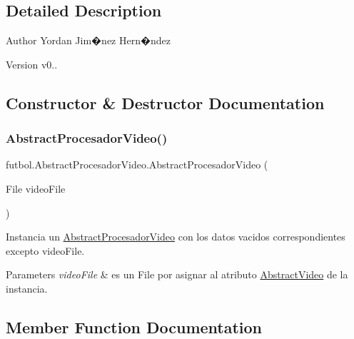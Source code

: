 \subsection{Detailed Description}
\begin{DoxyAuthor}{Author}
Yordan Jim�nez Hern�ndez 
\end{DoxyAuthor}
\begin{DoxyVersion}{Version}
v0.. 
\end{DoxyVersion}


\subsection{Constructor \& Destructor Documentation}
\hypertarget{classfutbol_1_1_abstract_procesador_video_a31d3acce4fce02bd1f2b93d4c2b48955}{}\label{classfutbol_1_1_abstract_procesador_video_a31d3acce4fce02bd1f2b93d4c2b48955} 
\subsubsection{\texorpdfstring{Abstract\+Procesador\+Video()}{AbstractProcesadorVideo()}}
{\footnotesize\ttfamily futbol.\+Abstract\+Procesador\+Video.\+Abstract\+Procesador\+Video (\begin{DoxyParamCaption}\item[{File}]{video\+File }\end{DoxyParamCaption})}

Instancia un \hyperlink{classfutbol_1_1_abstract_procesador_video}{Abstract\+Procesador\+Video} con los datos vacidos correspondientes excepto video\+File. 
\begin{DoxyParams}{Parameters}
{\em video\+File} & es un File por asignar al atributo \hyperlink{classfutbol_1_1_abstract_video}{Abstract\+Video} de la instancia. \\
\hline
\end{DoxyParams}


\subsection{Member Function Documentation}
\hypertarget{classfutbol_1_1_abstract_procesador_video_a0f419ff3816edd0a8a56c63b46f659c6}{}\label{classfutbol_1_1_abstract_procesador_video_a0f419ff3816edd0a8a56c63b46f659c6} 

